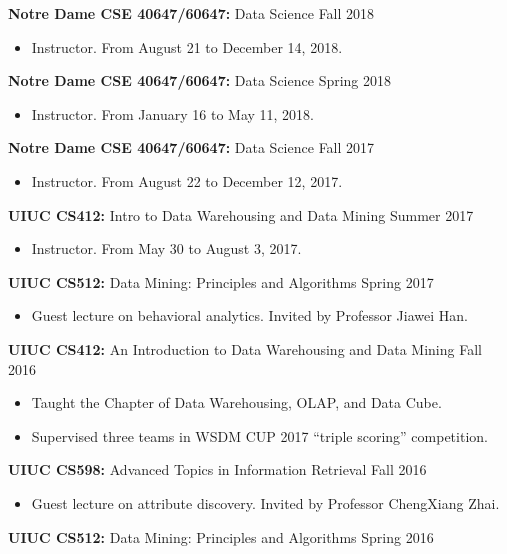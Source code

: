 \documentclass[margin, 9pt]{res}
\begin{document}
\begin{resume}
{\textbf{Notre Dame CSE 40647/60647:} Data Science} \hfill{Fall 2018}
\begin{itemize}
\item Instructor. From August 21 to December 14, 2018.
\end{itemize}
\vspace{-0.1in}
{\textbf{Notre Dame CSE 40647/60647:} Data Science} \hfill{Spring 2018}
\begin{itemize}
\item Instructor. From January 16 to May 11, 2018.
\end{itemize}
\vspace{-0.1in}
{\textbf{Notre Dame CSE 40647/60647:} Data Science} \hfill{Fall 2017}
\begin{itemize}
\item Instructor. From August 22 to December 12, 2017.
\end{itemize}
\vspace{-0.1in}
{\textbf{UIUC CS412:} Intro to Data Warehousing and Data Mining} \hfill{Summer 2017}
\begin{itemize}
\item Instructor. From May 30 to August 3, 2017.
\end{itemize}
\vspace{-0.1in}
{\textbf{UIUC CS512:} Data Mining: Principles and Algorithms} \hfill{Spring 2017}
\begin{itemize}
\item Guest lecture on behavioral analytics. Invited by Professor Jiawei Han.
\end{itemize}
\vspace{-0.1in}
{\textbf{UIUC CS412:} An Introduction to Data Warehousing and Data Mining} \hfill{Fall 2016}
\begin{itemize}
\item Taught the Chapter of Data Warehousing, OLAP, and Data Cube.
\item Supervised three teams in WSDM CUP 2017 ``triple scoring'' competition.
\end{itemize}
\vspace{-0.1in}
{\textbf{UIUC CS598:} Advanced Topics in Information Retrieval} \hfill{Fall 2016}
\begin{itemize}
\item Guest lecture on attribute discovery. Invited by Professor ChengXiang Zhai.
\end{itemize}
\vspace{-0.1in}
{\textbf{UIUC CS512:} Data Mining: Principles and Algorithms} \hfill{Spring 2016}

\end{resume}
\end{document}
